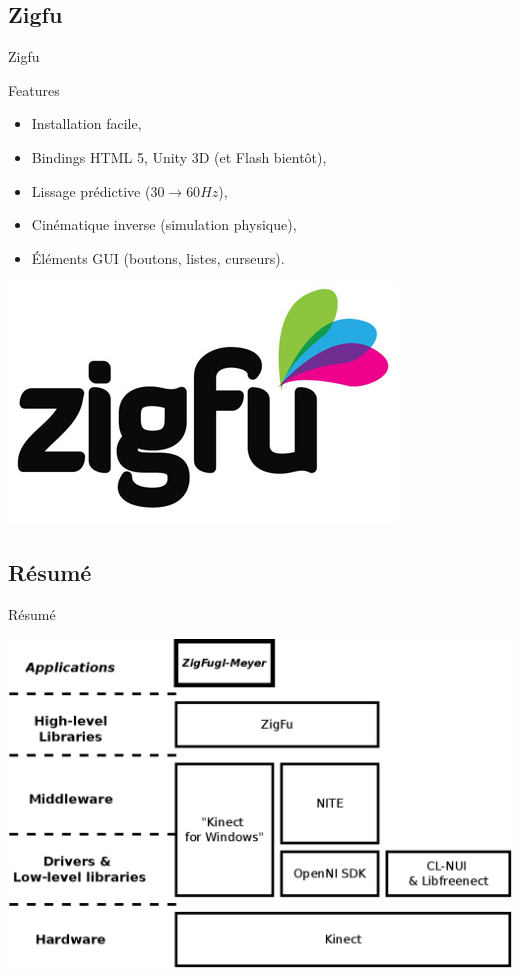 \subsection{Zigfu}
\begin{frame}{Zigfu}
\begin{block}{Features}
  \begin{itemize}
  \item Installation facile, 
  \item Bindings HTML 5, Unity 3D (et Flash bientôt),
  \item Lissage prédictive ($30 \rightarrow 60Hz$), 
  \item Cinématique inverse (simulation physique),
  \item Éléments GUI (boutons, listes, curseurs).
  \end{itemize}
\end{block}
\begin{center}
\includegraphics[width=0.2\linewidth]{../images/zigfu_logo}
\end{center}
\end{frame}

\subsection{Résumé}
\begin{frame}{Résumé}
\begin{center}
\includegraphics[width=0.9\linewidth]{../images/technology_overview_4}
\end{center}
\end{frame}